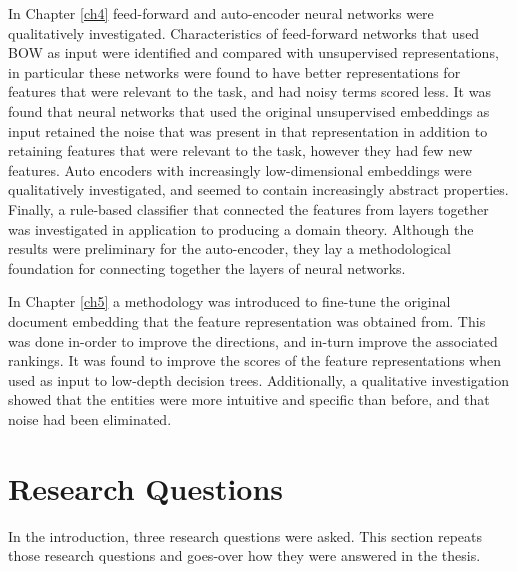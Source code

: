 In Chapter \ref{ch4} feed-forward and auto-encoder neural networks were qualitatively investigated. Characteristics of feed-forward networks that used BOW as input were identified and compared with unsupervised representations, in particular these networks were found to have better representations for features that were relevant to the task, and had noisy terms scored less. It was found that neural networks that used the original unsupervised embeddings as input retained the noise that was present in that representation in addition to retaining features that were relevant to the task, however they had few new features. Auto encoders with increasingly low-dimensional embeddings were qualitatively investigated, and seemed to contain increasingly abstract properties. Finally,  a rule-based classifier that connected the features from layers together was investigated in application to producing a domain theory. Although the results were preliminary for the auto-encoder, they lay a methodological foundation for connecting together the layers of neural networks. 

In Chapter \ref{ch5} a methodology was introduced to fine-tune the original document embedding that the feature representation was obtained from. This was done in-order to improve the directions, and in-turn improve the associated rankings. It was found to improve the scores of the feature representations when used as input to low-depth decision trees. Additionally, a qualitative investigation showed that the entities were more intuitive and specific than before, and that noise had been eliminated.






\section{Research Questions}

In the introduction, three research questions were asked. This section repeats those research questions and goes-over how they were answered in the thesis.

